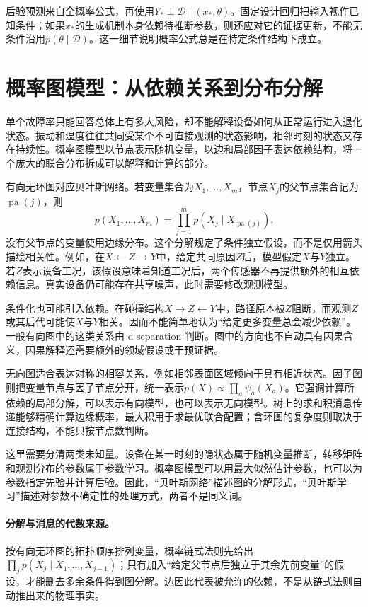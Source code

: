 后验预测来自全概率公式，再使用$Y_*\perp\mathcal D\mid(x_*,\theta)$。固定设计回归把输入视作已知条件；如果$x_*$的生成机制本身依赖待推断参数，则还应对它的证据更新，不能无条件沿用$p(\theta\mid\mathcal D)$。这一细节说明概率公式总是在特定条件结构下成立。

\section{概率图模型：从依赖关系到分布分解}
单个故障率只能回答总体上有多大风险，却不能解释设备如何从正常运行进入退化状态。振动和温度往往共同受某个不可直接观测的状态影响，相邻时刻的状态又存在持续性。概率图模型以节点表示随机变量，以边和局部因子表达依赖结构，将一个庞大的联合分布拆成可以解释和计算的部分\cite{bishop2006pattern,murphy2022pml}。

有向无环图对应贝叶斯网络。若变量集合为$X_1,\ldots,X_m$，节点$X_j$的父节点集合记为$\operatorname{pa}(j)$，则
\begin{equation}
 p(X_1,\ldots,X_m)=\prod_{j=1}^{m}p(X_j\mid X_{\operatorname{pa}(j)}).
\end{equation}
没有父节点的变量使用边缘分布。这个分解规定了条件独立假设，而不是仅用箭头描绘相关性。例如，在$X\leftarrow Z\rightarrow Y$中，给定共同原因$Z$后，模型假定$X$与$Y$独立。若$Z$表示设备工况，该假设意味着知道工况后，两个传感器不再提供额外的相互依赖信息。真实设备仍可能存在共享噪声，此时需要修改观测模型。

条件化也可能引入依赖。在碰撞结构$X\rightarrow Z\leftarrow Y$中，路径原本被$Z$阻断，而观测$Z$或其后代可能使$X$与$Y$相关。因而不能简单地认为“给定更多变量总会减少依赖”。一般有向图中的这类关系由 d-separation 判断。图中的方向也不自动具有因果含义，因果解释还需要额外的领域假设或干预证据。

无向图适合表达对称的相容关系，例如相邻表面区域倾向于具有相近状态。因子图则把变量节点与因子节点分开，统一表示$p(X)\propto\prod_a\psi_a(X_a)$。它强调计算所依赖的局部分解，可以表示有向模型，也可以表示无向模型。树上的求和积消息传递能够精确计算边缘概率，最大积用于求最优联合配置；含环图的复杂度则取决于连接结构，不能只按节点数判断。

这里需要分清两类未知量。设备在某一时刻的隐状态属于随机变量推断，转移矩阵和观测分布的参数属于参数学习。概率图模型可以用最大似然估计参数，也可以为参数指定先验并计算后验。因此，“贝叶斯网络”描述图的分解形式，“贝叶斯学习”描述对参数不确定性的处理方式，两者不是同义词。

\paragraph{分解与消息的代数来源。}
按有向无环图的拓扑顺序排列变量，概率链式法则先给出$\prod_jp(X_j\mid X_1,\ldots,X_{j-1})$；只有加入“给定父节点后独立于其余先前变量”的假设，才能删去多余条件得到图分解。边因此代表被允许的依赖，不是从链式法则自动推出来的物理事实。


